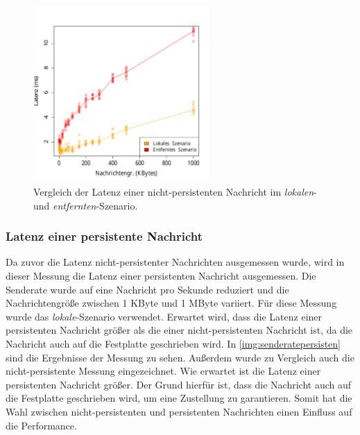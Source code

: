 \begin{figure}
\center
  \includegraphics[width=0.6\textwidth]{images/measurement/rate-limit-1-AvsB.pdf}
  \caption{Vergleich der Latenz einer nicht-persistenten Nachricht im \textit{lokalen}- und \textit{entfernten}-Szenario.}
  \label{img:senderate1-B}
\end{figure}

\subsubsection{Latenz einer persistente Nachricht}
\label{sec:persistent}
Da zuvor die Latenz nicht-persistenter Nachrichten ausgemessen wurde, wird in dieser Messung die Latenz einer persistenten Nachricht ausgemessen. Die Senderate wurde auf eine Nachricht pro Sekunde reduziert und die Nachrichtengröße zwischen 1 KByte und 1 MByte variiert. Für diese Messung wurde das \textit{lokale}-Szenario verwendet. Erwartet wird, dass die Latenz einer persistenten Nachricht größer als die einer nicht-persistenten Nachricht ist, da die Nachricht auch auf die Festplatte geschrieben wird.
In \autoref{img:senderatepersisten} sind die Ergebnisse der Messung zu sehen. Außerdem wurde zu Vergleich auch die nicht-persistente Messung eingezeichnet. Wie erwartet ist die Latenz einer persistenten Nachricht größer. Der Grund hierfür ist, dass die Nachricht auch auf die Festplatte geschrieben wird, um eine Zustellung zu garantieren. Somit hat die Wahl zwischen nicht-persistenten und persistenten Nachrichten einen Einfluss auf die Performance.

